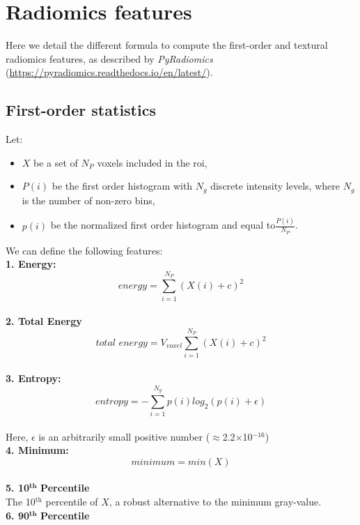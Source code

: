 \chapter{Radiomics features}\label{appendix---radiomicsFeatures}

Here we detail the different formula to compute the first-order and textural radiomics features, as described by \textit{PyRadiomics} (\url{https://pyradiomics.readthedocs.io/en/latest/}).

\newcommand*\mean[1]{\overline{#1}}

\section{First-order statistics}

Let:
\begin{itemize}
\item $X$ be a set of $N_{P}$ voxels included in the \ac{roi},
\item 
 $P\left(i\right)$ be the first order histogram with $N_{g}$ discrete intensity levels, where $N_{g}$ is the number of non-zero bins,
\item $p\left(i\right)$ be the normalized first order histogram and equal to$\frac{P\left(i\right)}{N_{P}}$.
\end{itemize}
We can define the following features: \\
\textbf{1. Energy:}\\
\[\textit{energy}=\sum _{i=1}^{N_{P}}\left(X\left(i\right)+c\right)^{2}\]\\
\textbf{2. Total Energy}\\
\[\textit{total energy}=V_{\textit{voxel}}\sum _{i=1}^{N_{P}}\left(X\left(i\right)+c\right)^{2}\] \\
\textbf{3. Entropy:}\\
\[\textit{entropy}=-\sum _{i=1}^{N_{g}}p\left(i\right)log_{2}\left(p\left(i\right)+\epsilon \right)\] \\
Here, $\epsilon $ is an arbitrarily small positive number (${\approx}$2.2${\times}$10$^{-16}$) \\
\textbf{4. Minimum:}\\
\[\textit{minimum}=min \left(X\right)\]\\
\textbf{5. 10}$^{\mathbf{th}}$ \textbf{Percentile}\\
The 10$^{\mathrm{th}}$ percentile of $X$, a robust alternative to the minimum gray-value.\\
\textbf{6. 90}$^{\mathbf{th}}$ \textbf{Percentile}\\
